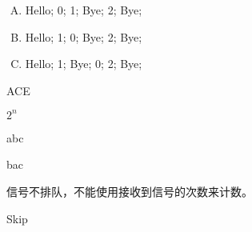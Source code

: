 {    %
    \begin{practicec}
        \begin{enumerate}[A.]
            \item
            {
                Hello;
                0;
                1;
                Bye;
                2;
                Bye;
            }
            \item
            {
                Hello;
                1;
                0;
                Bye;
                2;
                Bye;
            }
            \item
            {
                Hello;
                1;
                Bye;
                0;
                2;
                Bye;
            }
        \end{enumerate}
    \end{practicec}

    \begin{practicec}
        ACE
    \end{practicec}

    \begin{practicec}
        $2^n$
    \end{practicec}

    \begin{practicec}

    \end{practicec}

    \begin{practicec}
        abc

        bac
    \end{practicec}

    \begin{practicec}

    \end{practicec}

    \begin{practicec}
        信号不排队，不能使用接收到信号的次数来计数。
    \end{practicec}

    \begin{practicec}

    \end{practicec}

    \begin{practicec}

    \end{practicec}

    \begin{practicec}
        Skip
    \end{practicec}
}

